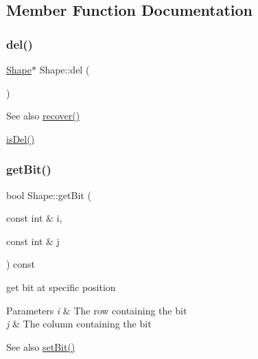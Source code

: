 \subsection{Member Function Documentation}
\mbox{\label{class_shape_a592b3cd82e09faba98018ff8498dd411}} 
\subsubsection{\texorpdfstring{del()}{del()}}
{\footnotesize\ttfamily \mbox{\hyperlink{class_shape}{Shape}}$\ast$ Shape\+::del (\begin{DoxyParamCaption}{ }\end{DoxyParamCaption})\hspace{0.3cm}{\ttfamily [inline]}}

\begin{DoxySeeAlso}{See also}
\mbox{\hyperlink{class_shape_aba906e02eb04a0b82caab679715204a7}{recover()}} 

\mbox{\hyperlink{class_shape_ab93f2288cad70553ecdaf61ae9b17533}{is\+Del()}} 
\end{DoxySeeAlso}
\mbox{\label{class_shape_ab486d732a49d49cbbc4fadf1f23c379e}} 
\subsubsection{\texorpdfstring{get\+Bit()}{getBit()}}
{\footnotesize\ttfamily bool Shape\+::get\+Bit (\begin{DoxyParamCaption}\item[{const int \&}]{i,  }\item[{const int \&}]{j }\end{DoxyParamCaption}) const\hspace{0.3cm}{\ttfamily [inline]}}



get bit at specific position 


\begin{DoxyParams}{Parameters}
{\em i} & The row containing the bit \\
\hline
{\em j} & The column containing the bit \\
\hline
\end{DoxyParams}
\begin{DoxySeeAlso}{See also}
\mbox{\hyperlink{class_shape_af3b265335667167ced81b3226b07dcb0}{set\+Bit()}} 
\end{DoxySeeAlso}
\mbox{\label{class_shape_a6ab685fc0e6aeec5d2e9743f5ecd66a4}} 
